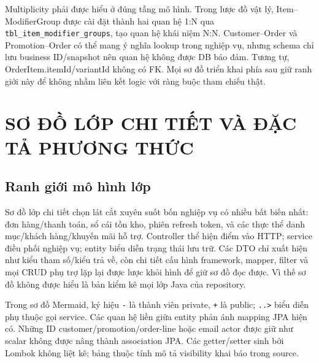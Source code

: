 \documentclass[12pt,a4paper,oneside]{report}
\begin{document}
Multiplicity phải được hiểu ở đúng tầng mô hình. Trong lược đồ vật lý, Item–ModifierGroup được cài đặt thành hai quan hệ 1:N qua \texttt{tbl\_item\_modifier\_groups}, tạo quan hệ khái niệm N:N. Customer–Order và Promotion–Order có thể mang ý nghĩa lookup trong nghiệp vụ, nhưng schema chỉ lưu business ID/snapshot nên quan hệ không được DB bảo đảm. Tương tự, OrderItem.itemId/variantId không có FK. Mọi sơ đồ triển khai phía sau giữ ranh giới này để không nhầm liên kết logic với ràng buộc tham chiếu thật.

\chapter{SƠ ĐỒ LỚP CHI TIẾT VÀ ĐẶC TẢ PHƯƠNG THỨC}

\section{Ranh giới mô hình lớp}
Sơ đồ lớp chi tiết chọn lát cắt xuyên suốt bốn nghiệp vụ có nhiều bất biến nhất: đơn hàng/thanh toán, sổ cái tồn kho, phiên refresh token, và các thực thể danh mục/khách hàng/khuyến mãi hỗ trợ. Controller thể hiện điểm vào HTTP; service điều phối nghiệp vụ; entity biểu diễn trạng thái lưu trữ. Các DTO chỉ xuất hiện như kiểu tham số/kiểu trả về, còn chi tiết cấu hình framework, mapper, filter và mọi CRUD phụ trợ lặp lại được lược khỏi hình để giữ sơ đồ đọc được. Vì thế sơ đồ không được hiểu là bản kiểm kê mọi lớp Java của repository.

Trong sơ đồ Mermaid, ký hiệu \texttt{-} là thành viên private, \texttt{+} là public; \texttt{..>} biểu diễn phụ thuộc gọi service. Các quan hệ liền giữa entity phản ánh mapping JPA hiện có. Những ID customer/promotion/order-line hoặc email actor được giữ như scalar không được nâng thành association JPA. Các getter/setter sinh bởi Lombok không liệt kê; bảng thuộc tính mô tả visibility khai báo trong source.
\end{document}
